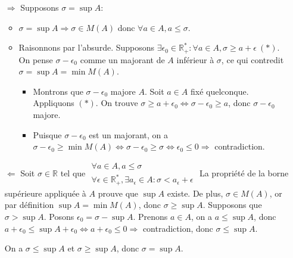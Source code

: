 \begin{demo}
    \begin{itemize}
        \item[$\Rightarrow$] Supposons $\sigma = \sup A$: \begin{itemize}
                \item $\sigma = \sup A \Rightarrow \sigma\in M(A)$ donc $\forall a\in A, a\leq\sigma$.
                \item Raisonnons par l'absurde. Supposons $\exists \epsilon_0\in\mathbb{R}_+^* : \forall a\in A, \sigma \geq a+\epsilon\ (*)$. On pense $\sigma - \epsilon_0$ comme un majorant de $A$ inférieur à $\sigma$, ce qui contredit $\sigma = \sup A = \min M(A)$. \begin{itemize}
                        \item Montrons que $\sigma - \epsilon_0$ majore $A$. Soit $a\in A$ fixé quelconque. Appliquons $(*)$. On trouve $\sigma \geq a+\epsilon_0 \Leftrightarrow \sigma-\epsilon_0\geq a$, donc $\sigma - \epsilon_0$ majore.
                        \item Puisque $\sigma - \epsilon_0$ est un majorant, on a $\sigma - \epsilon_0\geq \min M(A) \Leftrightarrow \sigma - \epsilon_0 \geq \sigma \Leftrightarrow \epsilon_0 \leq 0 \Rightarrow $ contradiction.
                    \end{itemize}
            \end{itemize}
        \item[$\Leftarrow$] Soit $\sigma\in\mathbb{R}$ tel que $\begin{array}{|l} \forall a\in A, a\leq \sigma\\\forall\epsilon\in\mathbb{R}_+^*,\exists a_\epsilon\in A: \sigma<a_\epsilon + \epsilon \end{array}$
                La propriété de la borne supérieure appliquée à $A$ prouve que $\sup A$ existe. De plus, $\sigma\in M(A)$, or par définition $\sup A = \min M(A)$, donc $\sigma\geq\sup A$. Supposons que $\sigma > \sup A$. Posons $\epsilon_0 = \sigma-\sup A$. Prenons $a\in A$, on a $a\leq\sup A$, donc $a+\epsilon_0\leq\sup A+\epsilon_0 \Leftrightarrow a+\epsilon_0\leq 0 \Rightarrow$ contradiction, donc $\sigma\leq\sup A$.

                On a $\sigma\leq\sup A$ et $\sigma\geq\sup A$, donc $\sigma = \sup A$.
    \end{itemize}
\end{demo}

